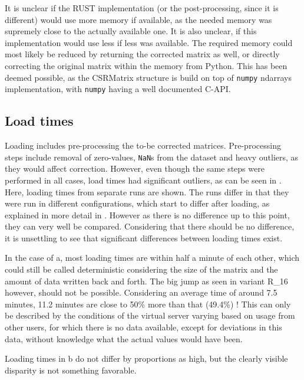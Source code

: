 It is unclear if the RUST implementation (or the post-processing, since it is
different) would use more memory if available, as the needed memory was
supremely close to the actually available one. It is also unclear, if this
implementation would use less if less was available. The required memory could
most likely be reduced by returning the corrected matrix as well, or directly
correcting the original matrix within the memory from Python. This has been
deemed possible, as the CSRMatrix structure is build on top of \verb|numpy|
ndarrays implementation, with \verb|numpy| having a well documented C-API.





\subsection{Load times}\label{sec:loadtime}



Loading includes pre-processing the to-be corrected matrices. Pre-processing
steps include removal of zero-values, \verb|NaN|s from the dataset and
heavy outliers, as they would affect correction. However, even though the same
steps were performed in all cases, load times had significant outliers, as can
be seen in . Here, loading times from separate runs are
shown. The runs differ in that they were run in different configurations, which
start to differ after loading, as explained in more detail in
. However as there is no difference up to this point,
they can very well be compared. Considering that there should be no difference,
it is unsettling to see that significant differences between loading times exist.

In the case of a, most loading times are within half a
minute of each other, which could still be called deterministic considering the
size of the matrix and the amount of data written back and forth. The big jump
as seen in variant R\_16 however, should not be possible. Considering an
average time of around 7.5 minutes, 11.2 minutes are close to 50\% more than
that (49.4\%) ! This can only be described by the conditions of the virtual
server varying based on usage from other users, for which there is no data
available, except for deviations in this data, without knowledge what the
actual values would have been.

Loading times in b do not differ by proportions as high,
but the clearly visible disparity is not something favorable.


